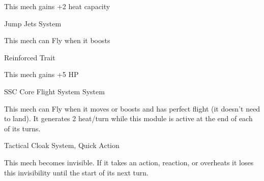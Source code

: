 This mech gains +2 heat capacity
 

Jump Jets  
System
 
This mech can Fly when it boosts
 

Reinforced  
Trait
 
This mech gains +5 HP
 

SSC Core Flight System  
System
 
This mech can Fly when it moves or boosts and has perfect flight (it doesn’t need to land). It  
generates 2 heat/turn while this module is active at the end of each of its turns.
 

Tactical Cloak  
System, Quick Action
 
This mech becomes invisible. If it takes an action, reaction, or overheats it loses this invisibility  
until the start of its next turn.
 

                                                                                                                
